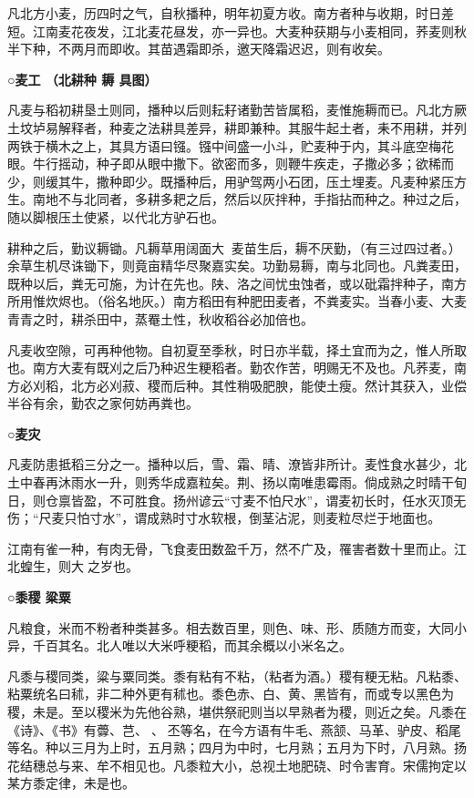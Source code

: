 \documentclass[]{article}
\begin{document}
凡北方小麦，历四时之气，自秋播种，明年初夏方收。南方者种与收期，时日差短。江南麦花夜发，江北麦花昼发，亦一异也。大麦种获期与小麦相同，荞麦则秋半下种，不两月而即收。其苗遇霜即杀，邀天降霜迟迟，则有收矣。

\textbf{○麦工 （北耕种 耨 具图）}

凡麦与稻初耕垦土则同，播种以后则耘耔诸勤苦皆属稻，麦惟施耨而已。凡北方厥土坟垆易解释者，种麦之法耕具差异，耕即兼种。其服牛起土者，耒不用耕，并列两铁于横木之上，其具方语曰镪。镪中间盛一小斗，贮麦种于内，其斗底空梅花眼。牛行摇动，种子即从眼中撒下。欲密而多，则鞭牛疾走，子撒必多；欲稀而少，则缓其牛，撒种即少。既播种后，用驴驾两小石团，压土埋麦。凡麦种紧压方生。南地不与北同者，多耕多耙之后，然后以灰拌种，手指拈而种之。种过之后，随以脚根压土使紧，以代北方驴石也。

耕种之后，勤议耨锄。凡耨草用阔面大，麦苗生后，耨不厌勤，（有三过四过者。）余草生机尽诛锄下，则竟亩精华尽聚嘉实矣。功勤易耨，南与北同也。凡粪麦田，既种以后，粪无可施，为计在先也。陕、洛之间忧虫蚀者，或以砒霜拌种子，南方所用惟炊烬也。（俗名地灰。）南方稻田有种肥田麦者，不粪麦实。当春小麦、大麦青青之时，耕杀田中，蒸罨土性，秋收稻谷必加倍也。

凡麦收空隙，可再种他物。自初夏至季秋，时日亦半载，择土宜而为之，惟人所取也。南方大麦有既刈之后乃种迟生粳稻者。勤农作苦，明赐无不及也。凡荞麦，南方必刈稻，北方必刈菽、稷而后种。其性稍吸肥腴，能使土瘦。然计其获入，业偿半谷有余，勤农之家何妨再粪也。

\textbf{○麦灾}

凡麦防患抵稻三分之一。播种以后，雪、霜、晴、潦皆非所计。麦性食水甚少，北土中春再沐雨水一升，则秀华成嘉粒矣。荆、扬以南唯患霉雨。倘成熟之时晴干旬日，则仓禀皆盈，不可胜食。扬州谚云``寸麦不怕尺水''，谓麦初长时，任水灭顶无伤；``尺麦只怕寸水''，谓成熟时寸水软根，倒茎沾泥，则麦粒尽烂于地面也。

江南有雀一种，有肉无骨，飞食麦田数盈千万，然不广及，罹害者数十里而止。江北蝗生，则大之岁也。

\textbf{○黍稷 粱粟}

凡粮食，米而不粉者种类甚多。相去数百里，则色、味、形、质随方而变，大同小异，千百其名。北人唯以大米呼粳稻，而其余概以小米名之。

凡黍与稷同类，粱与粟同类。黍有粘有不粘，（粘者为酒。）稷有粳无粘。凡粘黍、粘粟统名曰秫，非二种外更有秫也。黍色赤、白、黄、黑皆有，而或专以黑色为稷，未是。至以稷米为先他谷熟，堪供祭祀则当以早熟者为稷，则近之矣。凡黍在《诗》、《书》有虋、芑、、丕等名，在今方语有牛毛、燕颔、马革、驴皮、稻尾等名。种以三月为上时，五月熟；四月为中时，七月熟；五月为下时，八月熟。扬花结穗总与来、牟不相见也。凡黍粒大小，总视土地肥硗、时令害育。宋儒拘定以某方黍定律，未是也。
\end{document}
